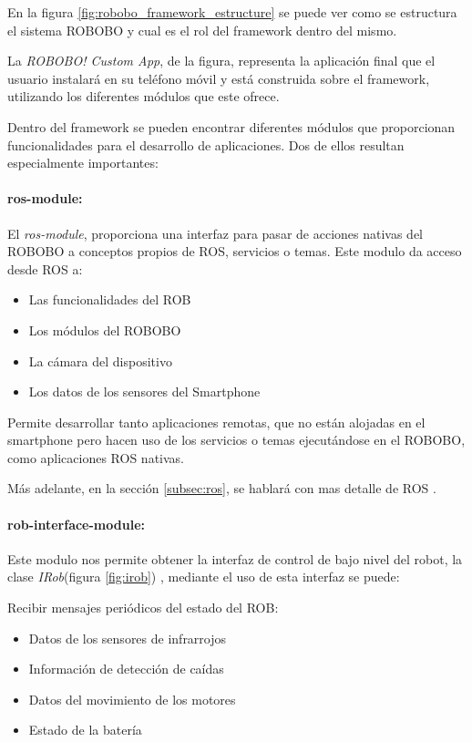 En la figura \ref{fig:robobo_framework_estructure} se puede ver como se estructura el sistema ROBOBO y cual es el rol del framework dentro del mismo.

La \textit{ROBOBO! Custom App}, de la figura, representa la aplicación final que el usuario instalará en su teléfono móvil y está construida sobre el framework, utilizando los diferentes módulos que este ofrece.

Dentro del framework se pueden encontrar diferentes módulos que proporcionan funcionalidades para el desarrollo de aplicaciones. Dos de ellos resultan especialmente importantes:

\paragraph*{ros-module:\\}
	 El \textit{ros-module}, proporciona una interfaz para pasar de acciones nativas del ROBOBO a conceptos propios de ROS, servicios o temas. Este modulo da acceso desde ROS a: 
	\begin{itemize}
		\item Las funcionalidades del ROB
		\item Los módulos del ROBOBO
		\item La cámara del dispositivo
		\item Los datos de los sensores del Smartphone
	\end{itemize} 
	Permite desarrollar tanto aplicaciones remotas, que no están alojadas en el smartphone pero  hacen uso de los servicios o temas ejecutándose en el ROBOBO, como aplicaciones ROS nativas.
	
Más adelante, en la sección \ref{subsec:ros}, se hablará con mas detalle de ROS .

\paragraph*{rob-interface-module:\\}
Este modulo nos permite obtener la interfaz de control de bajo nivel del robot, la clase \textit{IRob}(figura \ref{fig:irob}) , mediante el uso de esta interfaz se puede:

Recibir mensajes periódicos del estado del ROB:
\begin{itemize}
	\item Datos de los sensores de infrarrojos
	\item Información de detección de caídas
	\item Datos del movimiento de los motores
	\item Estado de la batería
\end{itemize}

